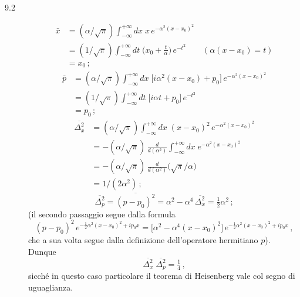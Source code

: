 \documentclass[11pt, a4paper]{book}
\numberwithin{equation}{section}
\begin{document}
\begin{description}
\item[9.2]
\begin{align*}
  \bar{x} &= (\alpha/\sqrt{\pi})\int_{-\infty}^{+\infty} dx\; x\,e^{-\alpha^2(x-x_0)^2}\\
  &= (1/\sqrt{\pi})\int_{-\infty}^{+\infty} dt\;\bigl(x_0+\tfrac{t}{\alpha}\bigr)\,e^{-t^2}
    \qquad(\alpha(x-x_0)=t)\\
  &= x_0\,;
\end{align*}
\begin{align*}
  \bar{p} &= (\alpha/\sqrt{\pi})\int_{-\infty}^{+\infty} dx\;
    \bigl[i\alpha^2(x-x_0)+p_0\bigr]\,e^{-\alpha^2(x-x_0)^2}\\
  &= (1/\sqrt{\pi})\int_{-\infty}^{+\infty} dt\;
    \bigl[i\alpha t + p_0\bigr]\,e^{-t^2}\\
  &= p_0\,;
\end{align*}
\begin{align*}
  \overline{\Delta_x^2} &= (\alpha/\sqrt{\pi})\int_{-\infty}^{+\infty} dx\;
    (x-x_0)^2\,e^{-\alpha^2(x-x_0)^2}\\
  &= -(\alpha/\sqrt{\pi})\,\frac{d}{d(\alpha^2)}\int_{-\infty}^{+\infty} dx\;
    e^{-\alpha^2(x-x_0)^2}\\
  &= -(\alpha/\sqrt{\pi})\,\frac{d}{d(\alpha^2)}\bigl(\sqrt{\pi}/\alpha\bigr)\\
  &= 1/(2\alpha^2)\,;
\end{align*}
\[
  \overline{\Delta_p^2} = \overline{(p-p_0)^2}
  = \alpha^2 - \alpha^4\,\overline{\Delta_x^2}
  = \tfrac{1}{2}\alpha^2\,;
\]
(il secondo passaggio segue dalla formula
\[
  (p-p_0)^2\,e^{-\frac{1}{2}\alpha^2(x-x_0)^2+ip_0 x}
  = \bigl[\alpha^2 - \alpha^4(x-x_0)^2\bigr]\,e^{-\frac{1}{2}\alpha^2(x-x_0)^2+ip_0 x}\,,
\]
che a sua volta segue dalla definizione dell'operatore hermitiano $p$). Dunque
\[
  \overline{\Delta_x^2}\;\overline{\Delta_p^2} = \tfrac{1}{4}\,,
\]
sicché in questo caso particolare il teorema di Heisenberg vale col segno di uguaglianza.


\end{description}
\end{document}
